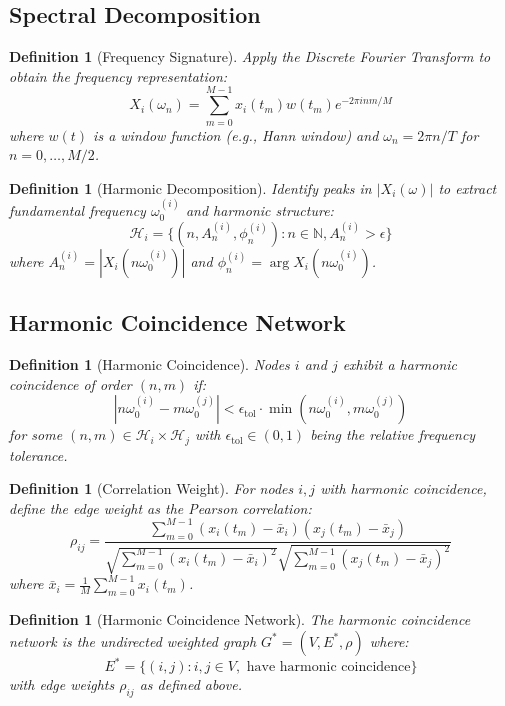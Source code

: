 \documentclass[12pt]{article}
\newtheorem{definition}[theorem]{Definition}
\begin{document}
\subsection{Spectral Decomposition}

\begin{definition}[Frequency Signature]
Apply the Discrete Fourier Transform to obtain the frequency representation:
$$
X_i(\omega_n) = \sum_{m=0}^{M-1} x_i(t_m) w(t_m) e^{-2\pi i n m / M}
$$
where $w(t)$ is a window function (e.g., Hann window) and $\omega_n = 2\pi n / T$ for $n = 0, \ldots, M/2$.
\end{definition}

\begin{definition}[Harmonic Decomposition]
Identify peaks in $|X_i(\omega)|$ to extract fundamental frequency $\omega_0^{(i)}$ and harmonic structure:
$$
\mathcal{H}_i = \{(n, A_n^{(i)}, \phi_n^{(i)}) : n \in \mathbb{N}, A_n^{(i)} > \epsilon\}
$$
where $A_n^{(i)} = |X_i(n\omega_0^{(i)})|$ and $\phi_n^{(i)} = \arg X_i(n\omega_0^{(i)})$.
\end{definition}

\subsection{Harmonic Coincidence Network}

\begin{definition}[Harmonic Coincidence]
Nodes $i$ and $j$ exhibit a harmonic coincidence of order $(n,m)$ if:
$$
\left| n\omega_0^{(i)} - m\omega_0^{(j)} \right| < \epsilon_{\text{tol}} \cdot \min(n\omega_0^{(i)}, m\omega_0^{(j)})
$$
for some $(n,m) \in \mathcal{H}_i \times \mathcal{H}_j$ with $\epsilon_{\text{tol}} \in (0,1)$ being the relative frequency tolerance.
\end{definition}

\begin{definition}[Correlation Weight]
For nodes $i,j$ with harmonic coincidence, define the edge weight as the Pearson correlation:
$$
\rho_{ij} = \frac{\sum_{m=0}^{M-1} (x_i(t_m) - \bar{x}_i)(x_j(t_m) - \bar{x}_j)}{\sqrt{\sum_{m=0}^{M-1}(x_i(t_m) - \bar{x}_i)^2} \sqrt{\sum_{m=0}^{M-1}(x_j(t_m) - \bar{x}_j)^2}}
$$
where $\bar{x}_i = \frac{1}{M}\sum_{m=0}^{M-1} x_i(t_m)$.
\end{definition}

\begin{definition}[Harmonic Coincidence Network]
The harmonic coincidence network is the undirected weighted graph $G^* = (V, E^*, \rho)$ where:
$$
E^* = \{(i,j) : i,j \in V, \text{ have harmonic coincidence}\}
$$
with edge weights $\rho_{ij}$ as defined above.
\end{definition}
\end{document}
